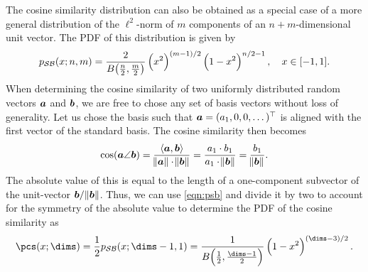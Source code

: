 The cosine similarity distribution can also be obtained as a special case of a more general distribution of the $\ell^2$-norm of $m$ components of an $n+m$-dimensional unit vector.
The PDF of this distribution is given by~\parencite{harman2010,gosmann216}
\begin{equation}
    p_{\mathcal{SB}}(x; n, m) = \frac{2}{B\!\del{\frac{n}{2}, \frac{m}{2}}} \del{x^2}^{(m-1)/2} \del{1 - x^2}^{n/2 - 1},\quad x \in [-1, 1] \text{.}\label{eqn:psb}
\end{equation}
When determining the cosine similarity of two uniformly distributed random vectors $\bm{a}$ and $\bm{b}$, we are free to chose any set of basis vectors without loss of generality.
Let us chose the basis such that $\bm{a} = (a_1, 0, 0, \dots)^{\top}$ is aligned with the first vector of the standard basis.
The cosine similarity then becomes
\begin{equation}
    \cos(\bm{a} \angle \bm{b}) = \frac{\langle \bm{a}, \bm{b} \rangle}{\norm{\bm{a}} \cdot \norm{\bm{b}}} = \frac{a_1 \cdot b_1}{a_1 \cdot \norm{\bm{b}}} = \frac{b_1}{\norm{\bm{b}}} \text{.}
\end{equation}
The absolute value of this is equal to the length of a one-component subvector of the unit-vector $\bm{b}/\norm{\bm{b}}$.
Thus, we can use \cref{eqn:psb} and divide it by two to account for the symmetry of the absolute value to determine the PDF of the cosine similarity as
\begin{equation}
    \pcs(x; \dims) = \frac{1}{2} p_{\mathcal{SB}}(x; \dims - 1, 1) = \frac{1}{B\!\del{\frac{1}{2}, \frac{\dims - 1}{2}}} \del{1 - x^2}^{\del{\dims - 3}/2}\text{.}
\end{equation}
